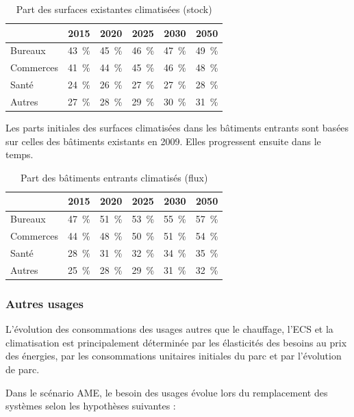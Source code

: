 \documentclass[10.5pt,a4paper]{article}
\begin{document}
{\begin{table}[h!] \caption{Part des surfaces existantes climatisées (stock)} 
\centering
\begin{tabular}[c]{|l|c|c|c|c|c|}
\hline
											& 	2015 &  2020	& 2025	& 2030 	& 2050	\\
\hline
Bureaux								 & 43~\% &	45~\% &	46~\%	&47~\%	&	49~\% \\
Commerces							 & 41~\% &	44~\% &	45~\%	&46~\%	&	48~\% \\ 
Santé									 & 24~\% &	26~\% &	27~\%	&27~\%	&	28~\% \\
Autres								 & 27~\% &	28~\% &	29~\%	&30~\%	&	31~\% \\
\hline
\end{tabular}
\end{table}

Les parts initiales des surfaces climatisées dans les bâtiments entrants sont basées sur celles des bâtiments existants en 2009. Elles progressent ensuite dans le temps. 

\begin{table}[h!] \caption{Part des bâtiments entrants climatisés (flux)}
\centering
\begin{tabular}[c]{|l|c|c|c|c|c|}
\hline
							& 	2015 &  2020	& 2025	& 2030 	& 2050	\\
\hline                                                  
Bureaux				&47~\% 	&	51~\% &	53~\% &	55~\% &	57~\%      \\
Commerces			&44~\% 	&	48~\% &	50~\% &	51~\% &	54~\%      \\ 
Santé					&28~\% 	&	31~\% &	32~\% &	34~\% &	35~\%      \\
Autres				&25~\% 	&	28~\% &	29~\% &	31~\% &	32~\%     \\
\hline
\end{tabular}
\end{table}

\subsubsection{Autres usages}

L’évolution des consommations des usages autres que le chauffage, l’ECS et la climatisation est principalement déterminée par les élasticités des besoins au prix des énergies, par les consommations unitaires initiales du parc et par l’évolution de parc. 

Dans le scénario AME, le besoin des usages évolue lors du remplacement des systèmes selon les hypothèses suivantes : 

}
\end{document}
